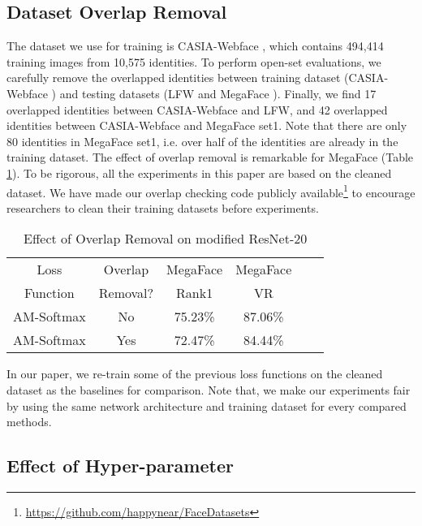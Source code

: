 \documentclass[10pt,twocolumn,letterpaper]{article}
\begin{document}
\subsection{Dataset Overlap Removal}

The dataset we use for training is CASIA-Webface \cite{yi2014learning}, which contains 494,414 training images from 10,575 identities. To perform open-set evaluations, we carefully remove the overlapped identities between training dataset (CASIA-Webface \cite{yi2014learning}) and testing datasets (LFW\cite{huang2007labeled} and MegaFace \cite{kemelmacher2016megaface}). Finally, we find 17 overlapped identities between CASIA-Webface and LFW, and 42 overlapped identities between CASIA-Webface and MegaFace set1. Note that there are only 80 identities in MegaFace set1, i.e. over half of the identities are already in the training dataset. The effect of overlap removal is remarkable for MegaFace (Table \ref{tab:overlap_removal}). To be rigorous, all the experiments in this paper are based on the cleaned dataset. We have made our overlap checking code publicly available\footnote{\url{https://github.com/happynear/FaceDatasets}} to encourage researchers to clean their training datasets before experiments.

\begin{table}[!htb]
	\centering
	\footnotesize
	\label{tab:overlap_removal}
	\begin{tabular}{cccccc}
		\toprule
		Loss & Overlap & MegaFace & MegaFace \\
		Function & Removal? & Rank1 & VR \\
		\midrule
AM-Softmax & No &  75.23\% & 87.06\%\\
		AM-Softmax & Yes & 72.47\% & 84.44\% \\
		\bottomrule
	\end{tabular}
	\vspace{2mm}
	\caption{Effect of Overlap Removal on modified ResNet-20}
\end{table}

In our paper, we re-train some of the previous loss functions on the cleaned dataset as the baselines for comparison. Note that, we make our experiments fair by using the same network architecture and training dataset for every compared methods.

\subsection{Effect of Hyper-parameter }
\end{document}
